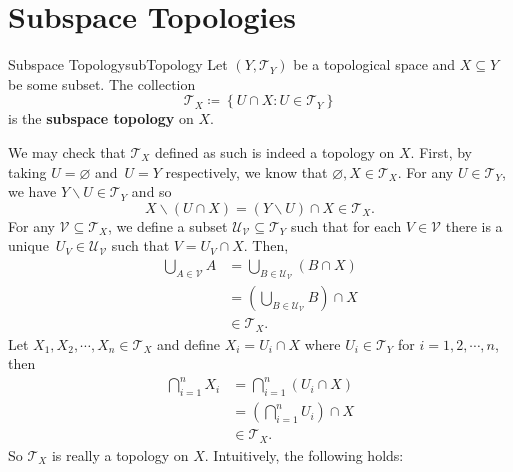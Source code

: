 \documentclass[math]{amznotes}
\theoremstyle{remark}
\begin{document}
\section{Subspace Topologies}
\begin{dfnbox}{Subspace Topology}{subTopology}
    Let $\left(Y, \mathcal{T}_Y\right)$ be a topological space and $X \subseteq Y$ be some subset. The collection
    \begin{equation*}
        \mathcal{T}_X \coloneqq \left\{U \cap X \colon U \in \mathcal{T}_Y\right\}
    \end{equation*}
    is the {\color{red} \textbf{subspace topology}} on $X$.
\end{dfnbox}
We may check that $\mathcal{T}_X$ defined as such is indeed a topology on $X$. First, by taking $U = \varnothing$ and~$U = Y$ respectively, we know that $\varnothing, X \in \mathcal{T}_X$. For any $U \in \mathcal{T}_Y$, we have $Y \backslash U \in \mathcal{T}_Y$ and so 
\begin{equation*}
    X \backslash \left(U \cap X\right) = \left(Y \backslash U\right) \cap X \in \mathcal{T}_X.
\end{equation*}
For any $\mathcal{V} \subseteq \mathcal{T}_X$, we define a subset $\mathcal{U_{\mathcal{V}}} \subseteq \mathcal{T}_Y$ such that for each $V \in \mathcal{V}$ there is a unique~$U_V \in \mathcal{U}_{\mathcal{V}}$ such that $V = U_V \cap X$. Then, 
\begin{align*}
    \bigcup_{A \in \mathcal{V}}A & = \bigcup_{B \in \mathcal{U}_{\mathcal{V}}}\left(B \cap X\right) \\
    & = \left(\bigcup_{B \in \mathcal{U}_{\mathcal{V}}}B\right) \cap X \\
    & \in \mathcal{T}_X.
\end{align*}
Let $X_1, X_2, \cdots, X_n \in \mathcal{T}_X$ and define $X_i = U_i \cap X$ where $U_i \in \mathcal{T}_Y$ for $i = 1, 2, \cdots, n$, then 
\begin{align*}
    \bigcap_{i = 1}^nX_i & = \bigcap_{i = 1}^n\left(U_i \cap X\right) \\
    & = \left(\bigcap_{i = 1}^nU_i\right) \cap X \\
    & \in \mathcal{T}_X.
\end{align*}
So $\mathcal{T}_X$ is really a topology on $X$. Intuitively, the following holds:
\end{document}
